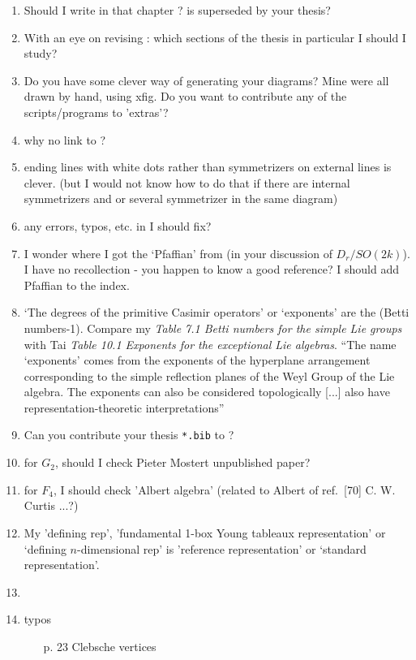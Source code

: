 \begin{enumerate}
  \item
Should I write in {\wwwgt} that chapter ? is superseded by your thesis?
  \item
With an eye on revising {\wwwgt}:
which sections of the thesis in particular I should I study?
  \item
Do you have some clever way of generating your diagrams?
  Mine were all drawn by hand, using xfig.
  Do you want to contribute any of the scripts/programs to {\wwwgt} 'extras'?
  \item
why no link to {\wwwgt}?
  \item
ending lines with white dots rather than symmetrizers on external lines
is clever. (but I would not know how to do that if there are internal
symmetrizers and or several symmetrizer in the same diagram)
  \item
any errors, typos, etc. in {\wwwgt} I should fix?
  \item
I wonder where I got the `Pfaffian' from (in your discussion of $D_r /
SO(2k)$). I have no recollection - you happen to know a good reference?
  I should add Pfaffian to the index.
  \item
`The degrees of the primitive Casimir operators' or
`exponents' are the (Betti numbers-1). Compare
my  {\em Table 7.1 Betti numbers for the simple Lie groups}
with  Tai {\em Table 10.1 Exponents for the exceptional Lie algebras}.
``The name `exponents' comes from the exponents of the hyperplane
arrangement corresponding to the simple reflection planes of the Weyl
Group of the Lie algebra. The exponents can also be considered
topologically [...] also have representation-theoretic interpretations''
  \item
Can you contribute your thesis \texttt{*.bib} to {\wwwgt}?
  \item
for $G_2$, should I check Pieter Mostert unpublished paper?
  \item
for $F_4$, I should check 'Albert algebra' (related to
{Albert} of
{\wwwgt} ref.~[70] C. W. Curtis ...?)
  \item
My 'defining rep', 'fundamental 1-box Young tableaux representation'
or `defining $n$-dimensional rep' is 'reference representation'
or `standard representation'.
  \item
  \item typos
  \begin{itemize}
    \item[p. 23] Clebsche vertices
  \end{itemize}
\end{enumerate}

